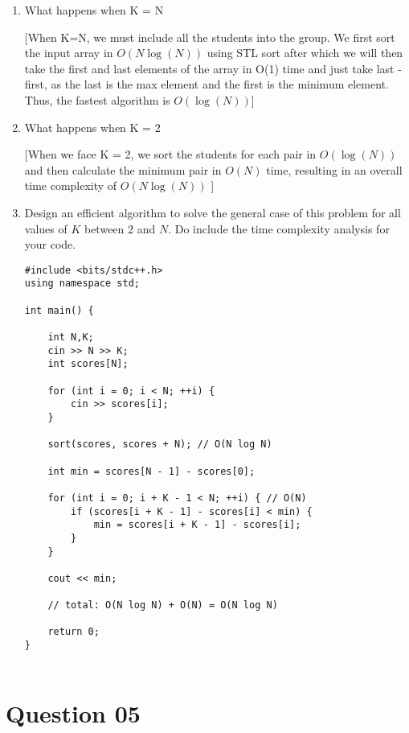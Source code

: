 \documentclass{article}
\begin{document}
\begin{enumerate}[label=(\arabic*)]

\item What happens when K = N

[When K=N, we must include all the students into the group. We first sort the input array in $O(N\log(N))$ using STL sort after which we will then take the first and last elements of the array in O(1) time and just take last - first, as the last is the max element and the first is the minimum element. Thus, the fastest algorithm is $O(\log(N))$]

\item What happens when K = 2

[When we face K = 2, we sort the students for each pair in $O(\log(N))$ and then calculate the minimum pair in $O(N)$ time, resulting in an overall time complexity of $O(N \log(N))$ ]

\item Design an efficient algorithm to solve the general case of this problem
for all values of $K$ between 2 and $N$. Do include the time complexity analysis for your code.

\begin{verbatim}
#include <bits/stdc++.h>
using namespace std;

int main() {

    int N,K;
    cin >> N >> K;
    int scores[N];
    
    for (int i = 0; i < N; ++i) {
        cin >> scores[i];
    }
    
    sort(scores, scores + N); // O(N log N)
    
    int min = scores[N - 1] - scores[0];
    
    for (int i = 0; i + K - 1 < N; ++i) { // O(N)
        if (scores[i + K - 1] - scores[i] < min) {
            min = scores[i + K - 1] - scores[i];
        }
    }

    cout << min;
    
    // total: O(N log N) + O(N) = O(N log N)

    return 0;
}
    
\end{verbatim}
\end{enumerate}

\section{Question 05}
\end{document}
